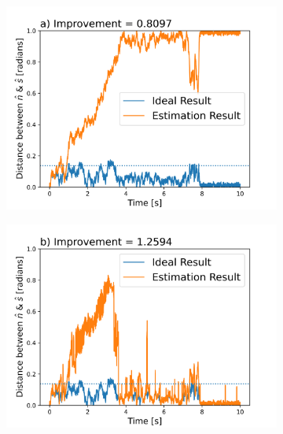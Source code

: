 \documentclass[final, 3p]{elsarticle}
\begin{document}
\begin{figure}[h]
	
	\centering
	\begin{subfigure}{0.32\textwidth}
		\includegraphics[width=\textwidth]{./Images/epsilon_at_5.png}
	\end{subfigure}
	\begin{subfigure}{0.32\textwidth}
		\includegraphics[width=\textwidth]{./Images/epsilon_at_15.png}
	\end{subfigure}
	\begin{subfigure}{0.32\textwidth}

\end{subfigure}
\end{figure}
\end{document}
